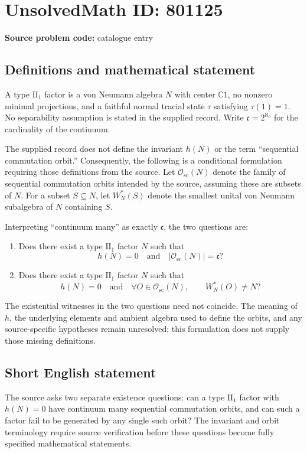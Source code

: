 \documentclass[11pt]{article}
\newcommand{\C}{\mathbb{C}}
\begin{document}
\section*{UnsolvedMath ID: 801125}
\textbf{Source problem code:} catalogue entry
\subsection{Definitions and mathematical statement}
A type \(\mathrm{II}_1\) factor is a von Neumann algebra \(N\) with center \(\C 1\), no nonzero minimal projections, and a faithful normal tracial state \(\tau\) satisfying \(\tau(1)=1\). No separability assumption is stated in the supplied record. Write \(\mathfrak c=2^{\aleph_0}\) for the cardinality of the continuum.

The supplied record does not define the invariant \(h(N)\) or the term ``sequential commutation orbit.'' Consequently, the following is a conditional formulation requiring those definitions from the source. Let \(\mathscr O_{\mathrm{sc}}(N)\) denote the family of sequential commutation orbits intended by the source, assuming these are subsets of \(N\). For a subset \(S\subseteq N\), let \(W_N^*(S)\) denote the smallest unital von Neumann subalgebra of \(N\) containing \(S\).

Interpreting ``continuum many'' as exactly \(\mathfrak c\), the two questions are:
\begin{enumerate}
\item Does there exist a type \(\mathrm{II}_1\) factor \(N\) such that
\[
h(N)=0
\quad\text{and}\quad
\lvert\mathscr O_{\mathrm{sc}}(N)\rvert=\mathfrak c?
\]
\item Does there exist a type \(\mathrm{II}_1\) factor \(N\) such that
\[
h(N)=0
\quad\text{and}\quad
\forall O\in\mathscr O_{\mathrm{sc}}(N),\qquad W_N^*(O)\ne N?
\]
\end{enumerate}
The existential witnesses in the two questions need not coincide. The meaning of \(h\), the underlying elements and ambient algebra used to define the orbits, and any source-specific hypotheses remain unresolved; this formulation does not supply those missing definitions.
\subsection{Short English statement}
The source asks two separate existence questions: can a type \(\mathrm{II}_1\) factor with \(h(N)=0\) have continuum many sequential commutation orbits, and can such a factor fail to be generated by any single such orbit? The invariant and orbit terminology require source verification before these questions become fully specified mathematical statements.
\end{document}
